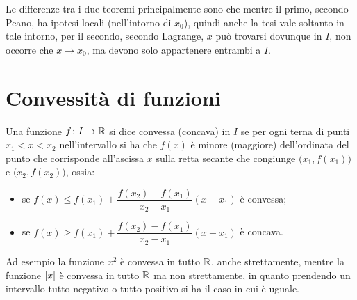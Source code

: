 Le differenze tra i due teoremi principalmente sono che mentre il primo, secondo Peano, ha ipotesi locali (nell'intorno di $x_0$), quindi anche la tesi vale soltanto in tale intorno, per il secondo, secondo Lagrange, $x$ può trovarsi dovunque in $I$, non occorre che $x\to x_0$, ma devono solo appartenere entrambi a $I$.

\section{Convessità di funzioni}
\begin{definizione}
\label{d:convessa}
Una funzione $f\colon I\to\mathbb{R}$ si dice convessa (concava) in $I$ se per ogni terna di punti $x_1<x<x_2$ nell'intervallo si ha che $f(x)$ è minore (maggiore) dell'ordinata del punto che corrisponde all'ascissa $x$ sulla retta secante che congiunge $\big(x_1,f(x_1)\big)$ e $\big(x_2,f(x_2)\big)$, ossia:
\begin{itemize}
\item se $f(x)\leq f(x_1)+\dfrac{f(x_2)-f(x_1)}{x_2-x_1}(x-x_1)$ è convessa;
\item se $f(x)\geq f(x_1)+\dfrac{f(x_2)-f(x_1)}{x_2-x_1}(x-x_1)$ è concava.
\end{itemize}
\end{definizione}
Ad esempio la funzione $x^2$ è convessa in tutto $\mathbb{R}$, anche strettamente, mentre la funzione $\lvert x\rvert$ è convessa in tutto $\mathbb{R}$ ma non strettamente, in quanto prendendo un intervallo tutto negativo o tutto positivo si ha il caso in cui è uguale.


